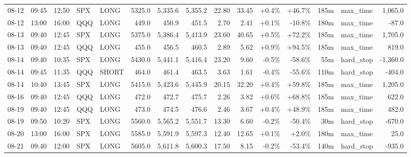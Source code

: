 \documentclass[11pt,a4paper,twoside]{article}
\begin{document}
\begin{landscape}
\begin{center}
\begin{longtable}{>{\color{txtmain}}l l l l l r r r r r r r r >{\color{txtmain}}l r}
08-12 & 09:45 & 12:50 & SPX & LONG & 5325.0 & 5,335.6 & 5,355.2 & 22.80 & 33.45 & \textcolor{wingreen}{+0.4\%} & \textcolor{wingreen}{+46.7\%} & 185m & max\_time & \textcolor{wingreen}{1,065.0} \\
08-12 & 13:00 & 16:00 & QQQ & LONG & 449.0 & 450.9 & 451.5 & 2.70 & 2.41 & \textcolor{wingreen}{+0.1\%} & \textcolor{lossred}{-10.8\%} & 180m & max\_time & \textcolor{lossred}{-87.0} \\
08-13 & 09:40 & 12:45 & SPX & LONG & 5375.0 & 5,386.4 & 5,413.9 & 23.60 & 40.65 & \textcolor{wingreen}{+0.5\%} & \textcolor{wingreen}{+72.2\%} & 185m & max\_time & \textcolor{wingreen}{1,705.0} \\
08-13 & 09:40 & 12:45 & QQQ & LONG & 455.0 & 456.5 & 460.5 & 2.89 & 5.62 & \textcolor{wingreen}{+0.9\%} & \textcolor{wingreen}{+94.5\%} & 185m & max\_time & \textcolor{wingreen}{819.0} \\
08-14 & 09:40 & 10:35 & SPX & LONG & 5430.0 & 5,441.1 & 5,416.4 & 23.20 & 9.60 & \textcolor{lossred}{-0.5\%} & \textcolor{lossred}{-58.6\%} & 55m & hard\_stop & \textcolor{lossred}{-1,360.0} \\
08-14 & 09:45 & 11:35 & QQQ & SHORT & 464.0 & 461.4 & 463.5 & 3.63 & 1.61 & \textcolor{lossred}{-0.4\%} & \textcolor{lossred}{-55.6\%} & 110m & hard\_stop & \textcolor{lossred}{-404.0} \\
08-14 & 10:40 & 13:45 & SPX & LONG & 5415.0 & 5,423.6 & 5,445.9 & 20.15 & 32.20 & \textcolor{wingreen}{+0.4\%} & \textcolor{wingreen}{+59.8\%} & 185m & max\_time & \textcolor{wingreen}{1,205.0} \\
08-16 & 09:40 & 12:45 & QQQ & LONG & 472.0 & 472.7 & 475.7 & 2.26 & 3.82 & \textcolor{wingreen}{+0.6\%} & \textcolor{wingreen}{+68.8\%} & 185m & max\_time & \textcolor{wingreen}{622.0} \\
08-19 & 09:40 & 12:45 & QQQ & LONG & 473.0 & 474.5 & 476.6 & 2.46 & 3.67 & \textcolor{wingreen}{+0.4\%} & \textcolor{wingreen}{+48.9\%} & 185m & max\_time & \textcolor{wingreen}{482.0} \\
08-19 & 09:50 & 10:20 & SPX & LONG & 5560.0 & 5,565.2 & 5,551.7 & 13.30 & 6.60 & \textcolor{lossred}{-0.2\%} & \textcolor{lossred}{-50.4\%} & 30m & hard\_stop & \textcolor{lossred}{-670.0} \\
08-20 & 13:00 & 16:00 & SPX & LONG & 5585.0 & 5,591.9 & 5,597.3 & 12.40 & 12.65 & \textcolor{wingreen}{+0.1\%} & \textcolor{wingreen}{+2.0\%} & 180m & max\_time & \textcolor{wingreen}{25.0} \\
08-21 & 09:40 & 12:00 & SPX & LONG & 5605.0 & 5,611.8 & 5,600.3 & 17.50 & 8.15 & \textcolor{lossred}{-0.2\%} & \textcolor{lossred}{-53.4\%} & 140m & hard\_stop & \textcolor{lossred}{-935.0} \\

\end{longtable}
\end{center}
\end{landscape}
\end{document}
